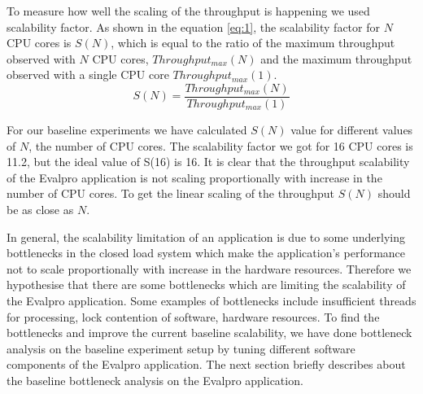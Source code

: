 \documentclass[sigconf]{acmart}
\begin{document}
To measure how well the scaling of the throughput is happening we used scalability factor. As shown in the equation \ref{eq:1}, the scalability factor for $N$ CPU cores is  $S(N)$, which is equal to the ratio of the maximum throughput observed with $N$ CPU cores,  $Throughput_{max}(N)$ and the maximum throughput observed with a single CPU core $Throughput_{max}(1)$.
\begin{equation}
  S(N)=\frac{Throughput_{max}(N)}{Throughput_{max}(1)}
  \label{eq:1}
\end{equation}

For our baseline experiments we have calculated $S(N)$ value for different values of $N$, the number of CPU cores. The scalability factor we got for 16 CPU cores is 11.2, but the ideal value of S(16) is 16. It is clear that the throughput scalability of the Evalpro application is not scaling proportionally with increase in the number of CPU cores. To get the linear scaling of the throughput  $S(N)$ should be as close as $N$. 

In general, the scalability limitation of an application is due to some underlying bottlenecks in the closed load system which make the application's performance not to  scale proportionally with increase in the hardware resources. Therefore we hypothesise that there are some bottlenecks  which are limiting the scalability of the Evalpro application. Some examples of bottlenecks include insufficient threads for processing, lock contention of software, hardware resources. To find the bottlenecks and improve the current baseline scalability, we have done bottleneck analysis on the baseline experiment setup by tuning different software components of the Evalpro application. The next section briefly describes about the baseline bottleneck analysis on the Evalpro application.
\end{document}
